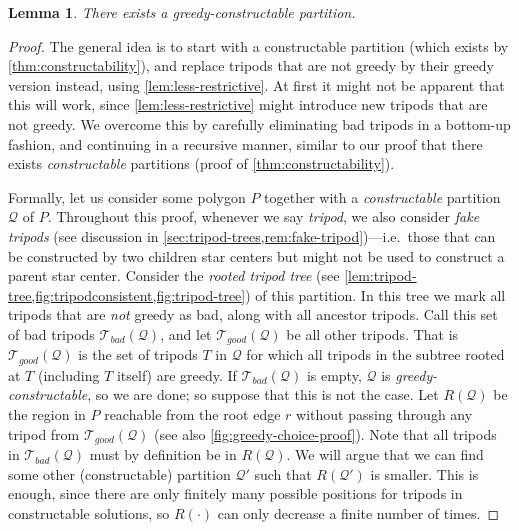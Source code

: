 \documentclass[10pt,a4paper]{article}
\newtheorem{lemma}{Lemma}[section]
\begin{document}
\begin{lemma}
\label{lem:greedy-constructable}
There exists a greedy-constructable partition. 
\end{lemma}

\begin{proof}
The general idea is to start with a constructable partition (which exists by \cref{thm:constructability}), and replace tripods that are not greedy by their greedy version instead, using \cref{lem:less-restrictive}.
At first it might not be apparent that this will work, since \cref{lem:less-restrictive} might introduce new tripods that are not greedy. We overcome this by carefully eliminating bad tripods in a bottom-up fashion, and continuing in a recursive manner, similar to our proof that there exists \emph{constructable} partitions (proof of \cref{thm:constructability}).

Formally, let us consider some polygon $P$ together with a \emph{constructable} partition $\mathcal{Q}$ of $P$. Throughout this proof, whenever we say \emph{tripod}, we also consider \emph{fake tripods} (see discussion in \cref{sec:tripod-trees,rem:fake-tripod})---i.e.\ those that can be constructed by two children star centers but might not be used to construct a parent star center.  Consider the \emph{rooted tripod tree} (see \cref{lem:tripod-tree,fig:tripodconsistent,fig:tripod-tree}) of this partition. In this tree we mark all tripods that are \emph{not} greedy as bad, along with all ancestor tripods. Call this set of bad tripods $\mathcal{T}_{bad}(\mathcal{Q})$, and let $\mathcal{T}_{good}(\mathcal{Q})$ be all other tripods. That is $\mathcal{T}_{good}(\mathcal{Q})$  is the set of tripods $T$ in $\mathcal{Q}$ for which all tripods in the subtree rooted at $T$ (including $T$ itself) are greedy. If $\mathcal{T}_{bad}(\mathcal{Q})$ is empty, $\mathcal{Q}$ is \emph{greedy-constructable}, so we are done; so suppose that this is not the case. Let $R(\mathcal{Q})$ be the region in $P$ reachable from the root edge $r$ without passing through any tripod from $\mathcal{T}_{good}(\mathcal{Q})$ (see also \cref{fig:greedy-choice-proof}). Note that all tripods in  $\mathcal{T}_{bad}(\mathcal{Q})$ must by definition be in $R(\mathcal{Q})$. We will argue that we can find some other (constructable) partition $\mathcal{Q}'$ such that $R(\mathcal{Q}')$ is smaller. This is enough, since there are only finitely many possible positions for tripods in constructable solutions, so $R(\cdot)$ can only decrease a finite number of times.



\end{proof}
\end{document}
